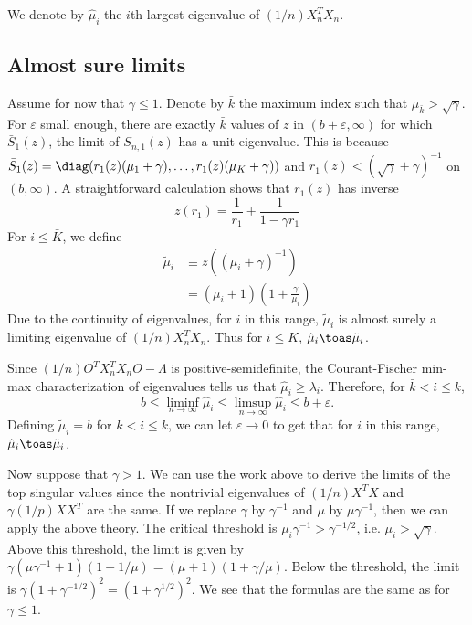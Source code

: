 We denote by $\hat \mu_i$ the $i$th largest eigenvalue of $(1/n) X_n^T X_n$.

\subsection{Almost sure limits}\label{SS:value-limit}

Assume for now that $\gamma \leq 1$.  Denote by $\bar k$ the maximum index such that $\mu_{\bar k} > \sqrt{\gamma}$.  For $\varepsilon$ small enough, there are exactly $\bar k$ values of $z$ in  $(b + \varepsilon, \infty)$ for which $\bar S_1(z)$, the limit of $S_{n,1}(z)$ has a unit eigenvalue.  This is because 
\(
    \bar S_1(z) 
    = 
    \diag( r_1(z) (\mu_1 + \gamma), \ldots, r_1(z) (\mu_K + \gamma))
\)
and $r_1(z) < (\sqrt{\gamma} + \gamma)^{-1}$ on $(b, \infty)$.  A straightforward calculation shows that $r_1(z)$ has inverse
\[
    z(r_1)
    =
    \frac{1}{r_1}
    + 
    \frac{1}{1 - \gamma r_1}
\]
For $i \leq \bar K$, we define
\begin{align*}
    \tilde \mu_i
    &\equiv z\left( (\mu_i + \gamma)^{-1} \right) \\
    &= \left( \mu_i + 1 \right) 
       \left( 1 + \frac{\gamma}{\mu_i} \right)
\end{align*}
Due to the continuity of eigenvalues, for $i$ in this range, $\tilde \mu_i$ is
almost surely a limiting eigenvalue of $(1/n) X_n^T X_n$.  Thus for $i \leq K$,
$\hat \mu_i \toas \tilde \mu_i$.

Since $(1/n) O^T X_n^T X_n O - \Lambda$ is positive-semidefinite, the
Courant-Fischer min-max characterization of eigenvalues tells us that
$\hat \mu_i \geq \lambda_i$. Therefore, for $\bar k < i \leq k$,
\[
    b
    \leq
    \liminf_{n \to \infty} \hat \mu_i
    \leq
    \limsup_{n \to \infty} \hat \mu_i    
    \leq
    b + \varepsilon.
\]
Defining $\tilde \mu_i = b$ for $\bar k < i \leq k$, we can let
$\varepsilon \to 0$ to get that for $i$ in this range,
$\hat \mu_i \toas \tilde \mu_i$.

Now suppose that $\gamma > 1$.  We can use the work above to derive the limits of the top singular values since the nontrivial eigenvalues of $(1/n) X^T X$ and $\gamma (1/p) X X^T$ are the same.  If we replace $\gamma$ by $\gamma^{-1}$ and $\mu$ by $\mu \gamma^{-1}$, then we can apply the above theory.  The critical threshold is $\mu_i \gamma^{-1} > \gamma^{-1/2}$, i.e. $\mu_i > \sqrt{\gamma}$.  Above this threshold, the limit is given by $\gamma ( \mu \gamma^{-1} + 1)(1 + 1/\mu) = (\mu + 1)\left( 1 + \gamma/\mu \right)$.  Below the threshold, the limit is $\gamma (1 + \gamma^{-1/2})^2 = (1 + \gamma^{1/2})^2$.  We see that the formulas are the same as for $\gamma \leq 1$.

